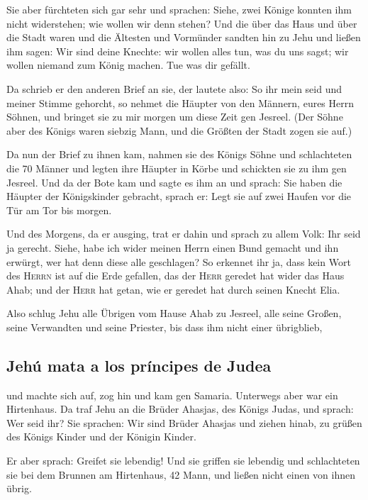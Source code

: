  Sie aber fürchteten sich gar sehr und sprachen: Siehe,
zwei Könige konnten ihm nicht widerstehen; wie wollen wir denn stehen?
 Und die über das Haus und über die Stadt waren und die
Ältesten und Vormünder sandten hin zu Jehu und ließen ihm sagen: Wir
sind deine Knechte: wir wollen alles tun, was du uns sagst; wir wollen
niemand zum König machen. Tue was dir gefällt.

 Da schrieb er den anderen Brief an sie, der lautete also:
So ihr mein seid und meiner Stimme gehorcht, so nehmet die Häupter von
den Männern, eures Herrn Söhnen, und bringet sie zu mir morgen um diese
Zeit gen Jesreel. (Der Söhne aber des Königs waren siebzig Mann, und die
Größten der Stadt zogen sie auf.)

 Da nun der Brief zu ihnen kam, nahmen sie des Königs
Söhne und schlachteten die 70 Männer und legten ihre Häupter in Körbe
und schickten sie zu ihm gen Jesreel.  Und da der Bote kam
und sagte es ihm an und sprach: Sie haben die Häupter der Königskinder
gebracht, sprach er: Legt sie auf zwei Haufen vor die Tür am Tor bis
morgen.

 Und des Morgens, da er ausging, trat er dahin und sprach
zu allem Volk: Ihr seid ja gerecht. Siehe, habe ich wider meinen Herrn
einen Bund gemacht und ihn erwürgt, wer hat denn diese alle geschlagen?
 So erkennet ihr ja, dass kein Wort des \textsc{Herrn}
ist auf die Erde gefallen, das der \textsc{Herr} geredet hat wider das
Haus Ahab; und der \textsc{Herr} hat getan, wie er geredet hat durch
seinen Knecht Elia.

 Also schlug Jehu alle Übrigen vom Hause Ahab zu Jesreel,
alle seine Großen, seine Verwandten und seine Priester, bis dass ihm
nicht einer übrigblieb,

\hypertarget{jehuxfa-mata-a-los-pruxedncipes-de-judea}{%
\subsection{Jehú mata a los príncipes de
Judea}\label{jehuxfa-mata-a-los-pruxedncipes-de-judea}}

 und machte sich auf, zog hin und kam gen Samaria.
Unterwegs aber war ein Hirtenhaus.  Da traf Jehu an die
Brüder Ahasjas, des Königs Judas, und sprach: Wer seid ihr? Sie
sprachen: Wir sind Brüder Ahasjas und ziehen hinab, zu grüßen des Königs
Kinder und der Königin Kinder.

 Er aber sprach: Greifet sie lebendig! Und sie griffen
sie lebendig und schlachteten sie bei dem Brunnen am Hirtenhaus, 42
Mann, und ließen nicht einen von ihnen übrig.

